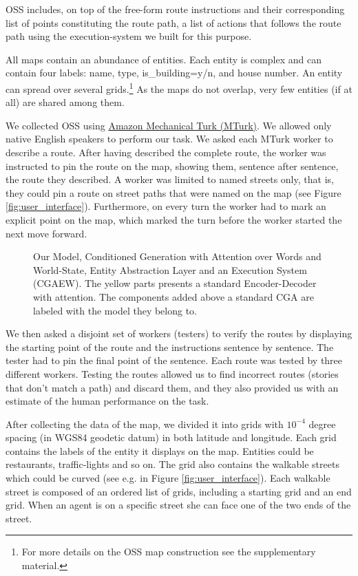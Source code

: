 \documentclass[11pt,a4paper]{article}
\begin{document}
OSS includes, on top of the free-form route instructions and their corresponding list of points constituting the route path,  a list of actions that follows the route path using the execution-system we built for this purpose. 

All maps contain an abundance of entities.
Each entity is complex and can contain four labels: name, type, is\_building=y/n, and house number. An entity can spread over several grids.\footnote{For more details on the OSS map construction see the supplementary  material.} 
As the maps do not overlap, very few entities (if at all) are shared among them. 

We collected OSS  using
\href{https://www.mturk.com/}{Amazon Mechanical Turk (MTurk)}.
We allowed only native English speakers to perform our task. 
We asked each MTurk worker to describe a route. After having described the complete route, the worker was instructed to pin the route on the map, showing them, sentence after sentence, the route they described. A worker was limited to named  streets only, that is, they could pin a route on street paths that were named on the map (see Figure \ref{fig:user_interface}). Furthermore, on every turn the worker had to mark an explicit point on the map, which marked the turn before the worker started the next move forward.




\begin{figure*}[t]
\centering
{}
 \caption{Our Model, Conditioned Generation with Attention over Words and World-State, Entity Abstraction Layer and an Execution System (CGAEW). The yellow parts presents a standard Encoder-Decoder with attention. The components added above a standard CGA are labeled with the model they belong to.}
\label{fig:model}
\end{figure*}


We then asked a disjoint set of workers (testers) to verify the routes by displaying the starting point of the route and the instructions sentence by sentence. The tester had to pin the final point of the sentence. Each route was tested by three different workers. Testing the routes allowed us to find incorrect routes (stories that don't match a path) and discard them, and they also   provided us with an estimate of  the human performance on the  task.  %

After collecting the data of the map, we divided it into grids with $10^{-4}$ degree spacing (in WGS84 geodetic datum) in both latitude and longitude. Each grid contains the labels of the entity it displays on the map. Entities could be restaurants, traffic-lights and so on. The grid also contains the walkable streets which could be curved (see e.g. in Figure \ref{fig:user_interface}). Each walkable street is composed of an ordered list of grids, including a starting grid and an end grid. When an agent is on a specific street she can face one of the two ends of the street. 
\end{document}
